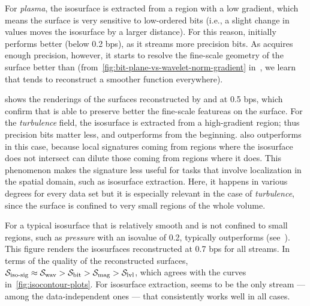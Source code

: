 For \emph{plasma}, the isosurface is extracted from a region with a low gradient, which means the
surface is very sensitive to low-ordered bits (i.e., a slight change in values moves the isosurface
by a larger distance). For this reason, \swav initially performs better (below 0.2 bps), as it
streams more precision bits. As \sbit acquires enough precision, however, it starts to resolve the
fine-scale geometry of the surface better than \swav
(from~\autoref{fig:bit-plane-vs-wavelet-norm-gradient} in~, we learn that \swav
tends to reconstruct a smoother function everywhere).

 shows the renderings of the surfaces reconstructed by \sbit
and \swav at 0.5 bps, which confirm that \sbit is able to preserve better the fine-scale featureas
on the surface. For the \emph{turbulence} field, the isosurface is extracted from a high-gradient
region; thus precision bits matter less, and \sbit outperforms \swav from the beginning. \sbit also
outperforms \sisg in this case, because local signatures coming from regions where the isosurface
does not intersect can dilute those coming from regions where it does. This phenomenon makes the
signature less useful for tasks that involve localization in the spatial domain, such as isosurface
extraction. Here, it happens in various degrees for every data set but it is especially relevant in
the case of \emph{turbulence}, since the surface is confined to very small regions of the whole
volume.

For a typical isosurface that is relatively smooth and is not confined to small regions, such as
\emph{pressure} with an isovalue of 0.2, \swav typically outperforms \sbit
(see~). This figure
renders the isosurfaces reconstructed at 0.7 bps for all streams. In terms of the quality of the
reconstructed surfaces, $\sisg \approx \swav > \sbit > \smag > \slvl$, which agrees with the curves
in~\autoref{fig:isocontour-plots}. For isosurface extraction, \swav seems to be the only stream ---
among the data-independent ones --- that consistently works well in all cases.
